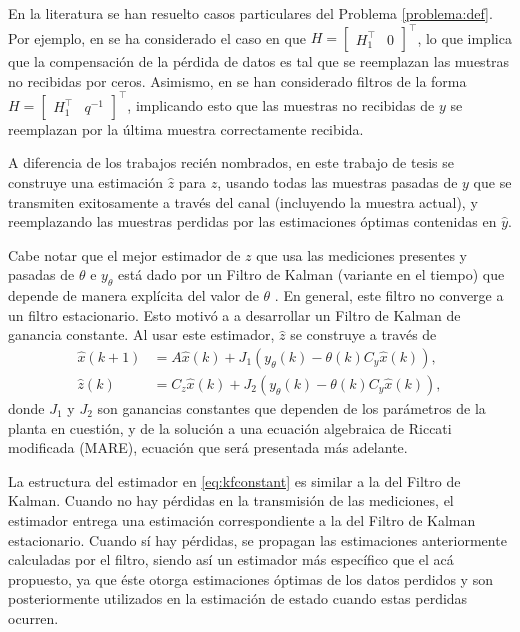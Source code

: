 En la literatura se han resuelto casos particulares del Problema \ref{problema:def}. Por ejemplo, en \cite{nahi69,tugnai81, hadsch79, costa94} se ha considerado el caso en que $H=\left[\begin{array}{cc}H_{1}^{\intercal}&0\end{array}\right]^{\intercal}$, lo que implica que la compensaci\'on de la p\'erdida de datos es tal que se reemplazan las muestras no recibidas por ceros. Asimismo, en \cite{sachsh07, suxixi08, lichpa10} se han considerado filtros de la forma $H=\left[\begin{array}{cc}H_{1}^{\intercal}&q^{-1}\end{array}\right]^{\intercal}$, implicando esto que las muestras no recibidas de $y$ se reemplazan por la \'ultima muestra correctamente recibida.

A diferencia de los trabajos reci\'en nombrados, en este trabajo de tesis se construye una estimaci\'on $\hat{z}$ para $z$, usando todas las muestras pasadas de $y$ que se transmiten exitosamente a trav\'es del canal (incluyendo la muestra actual), y reemplazando las muestras perdidas por las estimaciones \'optimas contenidas en $\hat{y}$.

Cabe notar que el mejor estimador de $z$ que usa las mediciones presentes y pasadas de $\theta$ e $y_{\theta}$ est\'a dado por un Filtro de Kalman (variante en el tiempo) que depende de manera expl\'icita del valor de $\theta$ \cite{siscfr04}. En general, este filtro no converge a un filtro estacionario. Esto motiv\'o a \cite{schenato2008optimal} a desarrollar un Filtro de Kalman de ganancia constante. Al usar este estimador, $\hat{z}$ se construye a trav\'es de
\begin{subequations}\label{eq:kfconstant}
\begin{align}
\hat{x}(k+1)&=A\hat{x}(k)+J_1\left(y_{\theta}(k)-\theta(k)C_y\hat{x}(k)\right),\\
\hat{z}(k)&=C_z\hat{x}(k)+J_2\left(y_{\theta}(k)-\theta(k)C_y\hat{x}(k)\right),
\end{align}
\end{subequations}
donde $J_1$ y $J_2$ son ganancias constantes que dependen de los par\'ametros de la planta en cuesti\'on, y de la soluci\'on a una ecuaci\'on algebraica de Riccati modificada (MARE), ecuación que será presentada más adelante.

La estructura del estimador en \eqref{eq:kfconstant} es similar a la del Filtro de Kalman. Cuando no hay p\'erdidas en la transmisi\'on de las mediciones, el estimador entrega una estimaci\'on correspondiente a la del Filtro de Kalman estacionario. Cuando s\'i hay p\'erdidas, se propagan las estimaciones anteriormente calculadas por el filtro, siendo as\'i un estimador m\'as espec\'ifico que el ac\'a propuesto, ya que \'este otorga estimaciones \'optimas de los datos perdidos y son posteriormente utilizados en la estimaci\'on de estado cuando estas perdidas ocurren.

